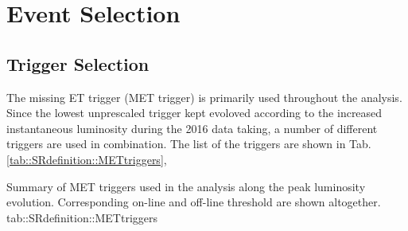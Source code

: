 \clearpage
\section{Event Selection} 

\subsection{Trigger Selection} \label{sec::Samples::trigger}
The missing ET trigger (MET trigger) is primarily used throughout the analysis.
Since the lowest unprescaled trigger kept evoloved according to the increased instantaneous luminosity during the 2016 data taking, a number of different triggers are used in combination.
The list of the triggers are shown in Tab. \ref{tab::SRdefinition::METtriggers},

{Summary of MET triggers used in the analysis along the peak luminosity evolution. Corresponding on-line and off-line threshold are shown altogether.}
{tab::SRdefinition::METtriggers}


